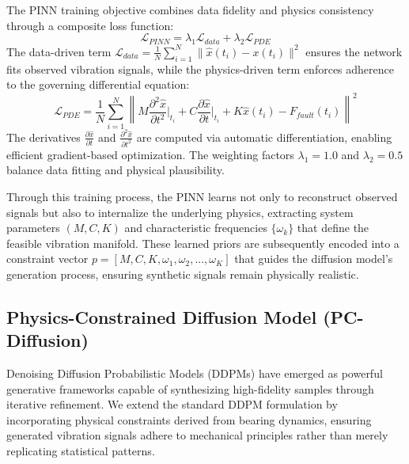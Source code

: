 The PINN training objective combines data fidelity and physics consistency through a composite loss function:
\begin{equation}
    \mathcal{L}_{PINN} = \lambda_1 \mathcal{L}_{data} + \lambda_2 \mathcal{L}_{PDE}
    \label{eq:pinn_loss}
\end{equation}
The data-driven term $\mathcal{L}_{data} = \frac{1}{N}\sum_{i=1}^N \|\hat{x}(t_i) - x(t_i)\|^2$ ensures the network fits observed vibration signals, while the physics-driven term enforces adherence to the governing differential equation:
\begin{equation}
    \mathcal{L}_{PDE} = \frac{1}{N}\sum_{i=1}^N \left\| M\frac{\partial^2 \hat{x}}{\partial t^2}\bigg|_{t_i} + C\frac{\partial \hat{x}}{\partial t}\bigg|_{t_i} + K\hat{x}(t_i) - F_{fault}(t_i) \right\|^2
    \label{eq:pde_residual}
\end{equation}
The derivatives $\frac{\partial \hat{x}}{\partial t}$ and $\frac{\partial^2 \hat{x}}{\partial t^2}$ are computed via automatic differentiation, enabling efficient gradient-based optimization. The weighting factors $\lambda_1=1.0$ and $\lambda_2=0.5$ balance data fitting and physical plausibility.

Through this training process, the PINN learns not only to reconstruct observed signals but also to internalize the underlying physics, extracting system parameters $(M, C, K)$ and characteristic frequencies $\{\omega_k\}$ that define the feasible vibration manifold. These learned priors are subsequently encoded into a constraint vector $p = [M, C, K, \omega_1, \omega_2, ..., \omega_K]$ that guides the diffusion model's generation process, ensuring synthetic signals remain physically realistic.


\subsection{Physics-Constrained Diffusion Model (PC-Diffusion)}
Denoising Diffusion Probabilistic Models (DDPMs) \cite{ho2020denoising} have emerged as powerful generative frameworks capable of synthesizing high-fidelity samples through iterative refinement. We extend the standard DDPM formulation by incorporating physical constraints derived from bearing dynamics, ensuring generated vibration signals adhere to mechanical principles rather than merely replicating statistical patterns.

